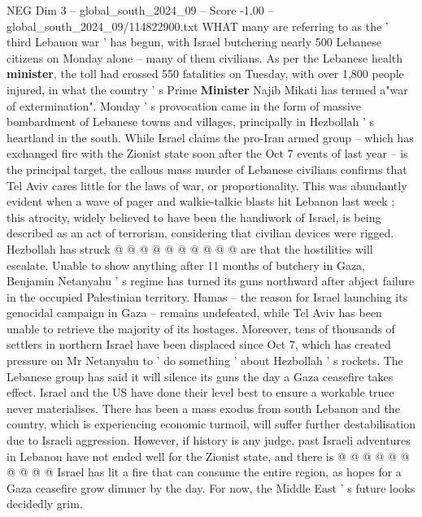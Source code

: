 \begin{textsample}{NEG Dim 3 – global\_south\_2024\_09 – Score -1.00 – global\_south\_2024\_09/114822900.txt}  \label{ex:f3_neg_124}
WHAT many are referring to as the ' third Lebanon war ' has begun, with Israel butchering nearly 500 Lebanese citizens on Monday alone -- many of them civilians.
As per the Lebanese health \textbf{minister}, the toll had crossed 550 fatalities on Tuesday, with over 1,800 people injured, in what the country ' s Prime \textbf{Minister} Najib Mikati has termed a"war of extermination".
Monday ' s provocation came in the form of massive bombardment of Lebanese towns and villages, principally in Hezbollah ' s heartland in the south.
While Israel claims the pro-Iran armed group -- which has exchanged fire with the Zionist state soon after the Oct 7 events of last year -- is the principal target, the callous mass murder of Lebanese civilians confirms that Tel Aviv cares little for the laws of war, or proportionality.
This was abundantly evident when a wave of pager and walkie-talkie blasts hit Lebanon last week ; this atrocity, widely believed to have been the handiwork of Israel, is being described as an act of terrorism, considering that civilian devices were rigged.
Hezbollah has struck @ @ @ @ @ @ @ @ @ @ are that the hostilities will escalate.
Unable to show anything after 11 months of butchery in Gaza, Benjamin Netanyahu ' s regime has turned its guns northward after abject failure in the occupied Palestinian territory.
Hamas -- the reason for Israel launching its genocidal campaign in Gaza -- remains undefeated, while Tel Aviv has been unable to retrieve the majority of its hostages.
Moreover, tens of thousands of settlers in northern Israel have been displaced since Oct 7, which has created pressure on Mr Netanyahu to ' do something ' about Hezbollah ' s rockets.
The Lebanese group has said it will silence its guns the day a Gaza ceasefire takes effect.
Israel and the US have done their level best to ensure a workable truce never materialises.
There has been a mass exodus from south Lebanon and the country, which is experiencing economic turmoil, will suffer further destabilisation due to Israeli aggression.
However, if history is any judge, past Israeli adventures in Lebanon have not ended well for the Zionist state, and there is @ @ @ @ @ @ @ @ @ @ Israel has lit a fire that can consume the entire region, as hopes for a Gaza ceasefire grow dimmer by the day.
For now, the Middle East ' s future looks decidedly grim.

\end{textsample}
